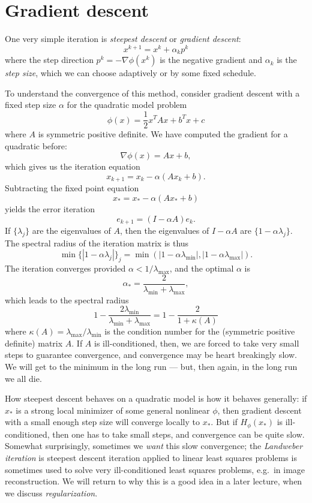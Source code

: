 \documentclass[12pt, leqno]{article} %
\begin{document}
\section{Gradient descent}

One very simple iteration is {\em steepest descent}
or {\em gradient descent}:
\begin{equation} \label{iter:gd}
  x^{k+1} = x^k + \alpha_k p^k
\end{equation}
where the step direction $p^k = -\nabla \phi(x^k)$ is the negative
gradient and $\alpha_k$ is the {\em step size}, which we can
choose adaptively or by some fixed schedule.

To understand the convergence of this method, consider gradient
descent with a fixed step size $\alpha$ for the quadratic model problem
\[
  \phi(x) = \frac{1}{2} x^T A x + b^T x + c
\]
where $A$ is symmetric positive definite.  
We have computed the gradient for a quadratic before:
\[
  \nabla \phi(x) = Ax + b,
\]
which gives us the iteration equation
\[
  x_{k+1} = x_k - \alpha (A x_k + b).
\]
Subtracting the fixed point equation
\[
  x_* = x_* - \alpha (A x_* + b)
\]
yields the error iteration
\[
  e_{k+1} = (I-\alpha A) e_k.
\]
If $\{ \lambda_j \}$ are the eigenvalues of $A$, then the
eigenvalues of $I-\alpha A$ are $\{ 1-\alpha \lambda_j \}$.
The spectral radius of the iteration matrix is thus
\[
  \min \{ |1-\alpha \lambda_j| \}_j =
  \min \left( |1-\alpha \lambda_{\min}|, |1-\alpha \lambda_{\max}| \right).
\]
The iteration converges provided $\alpha < 1/\lambda_{\max}$, and the
optimal $\alpha$ is
\[
  \alpha_* = \frac{2}{\lambda_{\min} + \lambda_{\max}},
\]
which leads to the spectral radius
\[
  1 - \frac{2 \lambda_{\min}}{\lambda_{\min} + \lambda_{\max}} =
  1 - \frac{2}{1 + \kappa(A)}
\]
where $\kappa(A) = \lambda_{\max}/\lambda_{\min}$ is the condition
number for the (symmetric positive definite) matrix $A$.  If $A$
is ill-conditioned, then, we are forced to take very small steps
to guarantee convergence, and convergence may be
heart breakingly slow.  We will get to the minimum in the long run
--- but, then again, in the long run we all die.

How steepest descent behaves on a quadratic model
is how it behaves generally: if $x_*$ is a
strong local minimizer of some general nonlinear $\phi$, then gradient
descent with a small enough step size will converge locally to
$x_*$.  But if $H_{\phi}(x_*)$ is ill-conditioned, then one has to
take small steps, and convergence can be quite slow.
Somewhat surprisingly, sometimes we {\em want} this slow convergence;
the {\em Landweber iteration} is steepest descent iteration applied to
linear least squares problems is sometimes used to solve very
ill-conditioned least squares problems, e.g.~in image reconstruction.
We will return to why this is a good idea in a later lecture,
when we discuss {\em regularization}.
\end{document}
